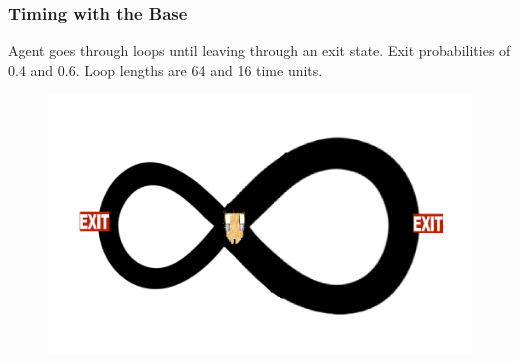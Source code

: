 \documentclass{beamer}
\begin{document}
\begin{frame}
\frametitle{Timing with the Base}
Agent goes through loops until leaving through an exit state. Exit probabilities of 0.4 and 0.6. Loop lengths are 64 and 16 time units.
\begin{figure}
\includegraphics[width=0.8\linewidth]{lucasplots/monImages/doubleLoopImage.png}
\end{figure}
\end{frame}
\end{document}
